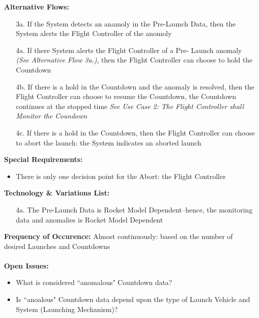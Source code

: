 \documentclass[letterpaper]{article}
\begin{document}
\textbf{Alternative Flows:}
\begin{itemize}
\item[3a.]If the System detects an anamoly in the Pre-Launch Data,
then the System alerts the Flight Controller of the anomoly
\item[4a.]If there System alerts the Flight Controller of a Pre-
Launch anomaly \textit{(See Alternative Flow 3a.)}, then the Flight
Controller can choose to hold the Countdown
\item[4b.]If there is a hold in the Countdown and the anomaly is
resolved, then the Flight Controller can choose to resume the
Countdown, the Countdown continues at the stopped time \textit{See
Use Case 2:  The Flight Controller shall Monitor the Coundown}
\item[4c.]If there is a hold in the Countdown, then the Flight
Controller can choose to abort the launch:  the System indicates an
aborted launch
\end{itemize}
\textbf{Special Requirements:}
\begin{itemize}
\item There is only one decision point for the Abort:  the Flight
Controller
\end{itemize}
\textbf{Technology \& Variations List:}
\begin{itemize}
\item [4a.]The Pre-Launch Data is Rocket Model Dependent--hence,
the monitoring data and anomalies is Rocket Model Dependent
\end{itemize}
\textbf{Frequency of Occurence:  }Almost continuously:  based on the
number of desired Launches and Countdowns\\\\
\textbf{Open Issues:}
\begin{itemize}
\item What is considered ``anomalous" Countdown data?
\item Is ``anoalous" Countdown data depend upon the type of Launch
Vehicle and System (Launching Mechanism)?
\end{itemize}
\end{document}
